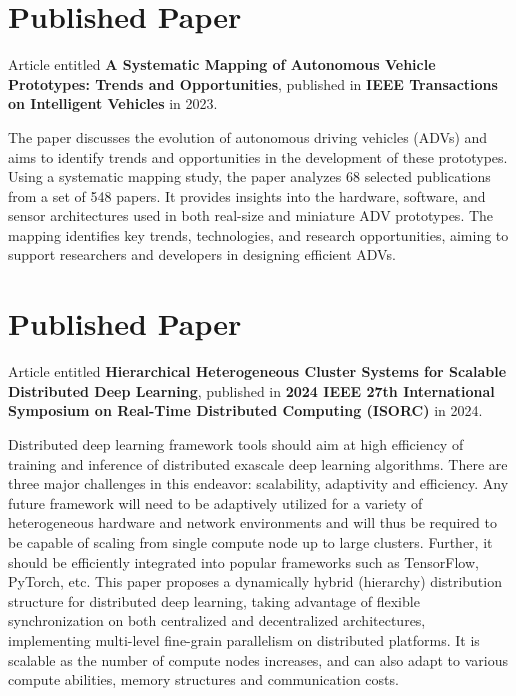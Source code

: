 \chapter{Published Paper}
\vspace{-1.9cm}

Article entitled \textbf{A Systematic Mapping of Autonomous Vehicle Prototypes: Trends and Opportunities}, published in \textbf{IEEE Transactions on Intelligent Vehicles} in 2023.

The paper discusses the evolution of autonomous driving vehicles (ADVs) and aims to identify trends and opportunities in the development of these prototypes. Using a systematic mapping study, the paper analyzes 68 selected publications from a set of 548 papers. It provides insights into the hardware, software, and sensor architectures used in both real-size and miniature ADV prototypes. The mapping identifies key trends, technologies, and research opportunities, aiming to support researchers and developers in designing efficient ADVs.



\chapter{Published Paper}
\vspace{-1.9cm}

Article entitled \textbf{Hierarchical Heterogeneous Cluster Systems for Scalable Distributed Deep Learning}, published in \textbf{2024 IEEE 27th International Symposium on Real-Time Distributed Computing (ISORC)} in 2024.

Distributed deep learning framework tools should aim at high efficiency of training and inference of distributed exascale deep learning algorithms. There are three major challenges in this endeavor: scalability, adaptivity and efficiency. Any future framework will need to be adaptively utilized for a variety of heterogeneous hardware and network environments and will thus be required to be capable of scaling from single compute node up to large clusters. Further, it should be efficiently integrated into popular frameworks such as TensorFlow, PyTorch, etc. This paper proposes a dynamically hybrid (hierarchy) distribution structure for distributed deep learning, taking advantage of flexible synchronization on both centralized and decentralized architectures, implementing multi-level fine-grain parallelism on distributed platforms. It is scalable as the number of compute nodes increases, and can also adapt to various compute abilities, memory structures and communication costs.

